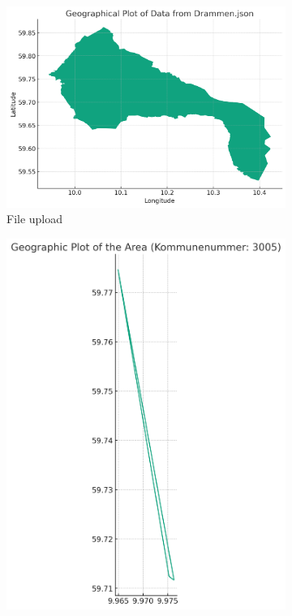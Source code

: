\begin{figure}
    \centering
    \begin{subfigure}{0.45\textwidth}
        \includegraphics[width=\linewidth]{../figs/drammen_outline_file_upload.png}
        \caption{File upload}
        \label{subfig:drammen-outline-file-upload}
    \end{subfigure}
    \hfill
    \begin{subfigure}{0.45\textwidth}
        \includegraphics[width=\linewidth]{../figs/drammen_outline_api.png}

\end{subfigure}
\end{figure}
